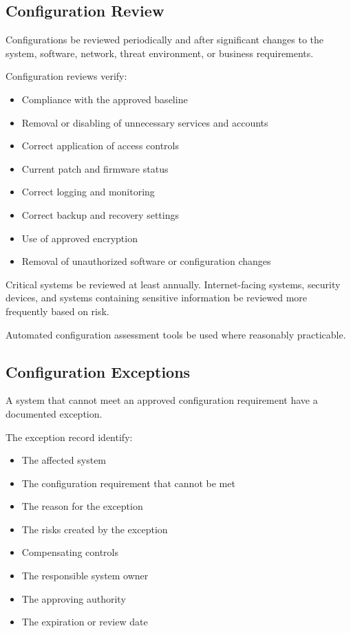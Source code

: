 \subsection{Configuration Review}

Configurations \must{} be reviewed periodically and after significant changes to the system, software, network, threat environment, or business requirements.

Configuration reviews \should{} verify:
\begin{itemize}
    \item Compliance with the approved baseline
    \item Removal or disabling of unnecessary services and accounts
    \item Correct application of access controls
    \item Current patch and firmware status
    \item Correct logging and monitoring
    \item Correct backup and recovery settings
    \item Use of approved encryption
    \item Removal of unauthorized software or configuration changes
\end{itemize}

Critical systems \should{} be reviewed at least annually. Internet-facing systems, security devices, and systems containing sensitive information \should{} be reviewed more frequently based on risk.

Automated configuration assessment tools \should{} be used where reasonably practicable.

\subsection{Configuration Exceptions}

A system that cannot meet an approved configuration requirement \must{} have a documented exception.

The exception record \must{} identify:
\begin{itemize}
    \item The affected system
    \item The configuration requirement that cannot be met
    \item The reason for the exception
    \item The risks created by the exception
    \item Compensating controls
    \item The responsible system owner
    \item The approving authority
    \item The expiration or review date
\end{itemize}


